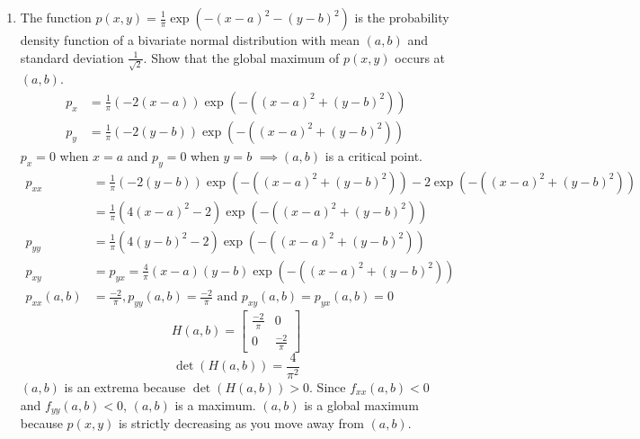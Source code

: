 \begin{enumerate}
	\item The function $p(x,y) = \frac{1}{\pi}\exp{\left(-(x-a)^2 - (y-b)^2\right)}$ is the probability density function of a bivariate normal distribution with mean $(a,b)$ and standard deviation $\frac{1}{\sqrt{2}}$. Show that the global maximum of $p(x,y)$ occurs at $(a,b)$.
	\begin{align*}
		p_x &= \frac{1}{\pi}(-2(x-a))\exp{(-((x-a)^2 + (y-b)^2))} \\
		p_y &= \frac{1}{\pi}(-2(y-b))\exp{(-((x-a)^2 + (y-b)^2))}	
	\end{align*}
	$p_x = 0$ when $x=a$ and $p_y = 0$ when $y=b$
	$\implies (a,b)$ is a critical point.
	\begin{align*}
		p_{xx} &= \frac{1}{\pi}(-2(y-b))\exp{(-((x-a)^2 + (y-b)^2))} - 2\exp{(-((x-a)^2 + (y-b)^2))} \\
		&= \frac{1}{\pi}(4(x-a)^2 - 2)\exp{(-((x-a)^2 + (y-b)^2))} \\
		p_{yy} &= \frac{1}{\pi}(4(y-b)^2 - 2)\exp{(-((x-a)^2 + (y-b)^2))} \\
		p_{xy} &= p_{yx} = \frac{4}{\pi}(x-a)(y-b)\exp{(-((x-a)^2 + (y-b)^2))} \\
		p_{xx}(a,b) &= \frac{-2}{\pi}, p_{yy}(a,b) = \frac{-2}{\pi} \text{ and } p_{xy}(a,b) = p_{yx}(a,b) = 0
	\end{align*}
	\begin{equation*}
		H(a,b) = \begin{bmatrix}
		\frac{-2}{\pi} & 0 \\
		0 & \frac{-2}{\pi}
		\end{bmatrix}
	\end{equation*}
	\begin{equation*}
		\det{(H(a,b))} = \frac{4}{\pi^2}
	\end{equation*}
	$(a,b)$ is an extrema because $\det{(H(a,b))} > 0$.
	Since $f_{xx}(a,b) < 0$ and $f_{yy}(a,b) < 0$, $(a,b)$ is a maximum.
	$(a,b)$ is a global maximum because $p(x,y)$ is strictly decreasing as you move away from $(a,b)$.\\
	

\end{enumerate}
